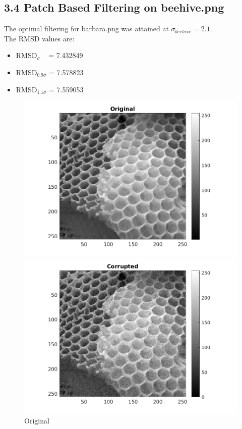 \documentclass[12pt, a4paper]{article}
\begin{document}
\subsection*{3.4 Patch Based Filtering on beehive.png}
\noindent The optimal filtering for barbara.png was attained at $\sigma_{beehive} = 2.1$. \\
The RMSD values are:
\begin{itemize}
	\item RMSD$_{\sigma}\;\;\;$  = 7.432849
	\item RMSD$_{0.9\sigma}$ = 7.578823
	\item RMSD$_{1.1\sigma}$ = 7.559053
\end{itemize}
\begin{figure}[h]
    \centering
    \renewcommand{\thefigure}{3.4(a)}
    \begin{minipage}[c][1\width]{0.3\textwidth}
    	\hspace*{-1in}
    	\includegraphics[width=1.5\textwidth]{Honeycomb_original.png}
    	\caption{Original}
	    \label{fig:3.4(a)}
    \end{minipage}
    \renewcommand{\thefigure}{3.4(b)}
    \begin{minipage}[c][1\width]{0.3\textwidth}
    	\hspace*{-0.5in}
    	\includegraphics[width=1.5\textwidth]{Honeycomb_corrupted.png}

\end{minipage}
\end{figure}
\end{document}

